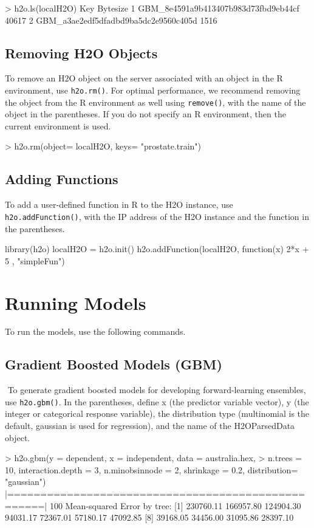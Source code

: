 \documentclass[11pt]{article}
\begin{document}
\begin{enumerate}
\begin{spverbatim}
> h2o.ls(localH2O)
                                                   Key Bytesize
      1               GBM_8e4591a9b413407b983d73fbd9eb44cf    40617
      2               GBM_a3ae2edf5dfadbd9ba5dc2e9560c405d     1516
\end{spverbatim}


\subsection{Removing H2O Objects}

To remove an H2O object on the server associated with an object in the R environment, use {\texttt{h2o.rm()}}. For optimal performance, we recommend removing the object from the R environment as well using {\texttt{remove()}}, with the name of the object in the parentheses. If you do not specify an R environment, then the current environment is used. 
\begin{spverbatim}
> h2o.rm(object= localH2O, keys= "prostate.train")
\end{spverbatim}


\subsection{Adding Functions}

To add a user-defined function in R to the H2O instance, use {\texttt{h2o.addFunction()}}, with the IP address of the H2O instance and the function in the parentheses.  
\begin{spverbatim}
library(h2o)
localH2O = h2o.init()
h2o.addFunction(localH2O, function(x) { 2*x + 5 }, "simpleFun")
\end{spverbatim}


\section{Running Models}

To run the models, use the following commands. 
\subsection{Gradient Boosted Models (GBM)}
 To generate gradient boosted models for developing forward-learning ensembles, use {\texttt{h2o.gbm()}}.  In the parentheses, define x (the predictor variable vector), y (the integer or categorical response variable), the distribution type (multinomial is the default, gaussian is used for regression), and the name of the H2OParsedData object. 
\begin{spverbatim}
> h2o.gbm(y = dependent, x = independent, data = australia.hex,
> n.trees = 10, interaction.depth = 3,
   n.minobsinnode = 2, shrinkage = 0.2, distribution= "gaussian")
     |===================================================| 100%
 Mean-squared Error by tree:
  [1] 230760.11 166957.80 124904.30  94031.17  72367.01  57180.17  47092.85
  [8]  39168.05  34456.00  31095.86  28397.10


\end{spverbatim}
\end{enumerate}
\end{document}
